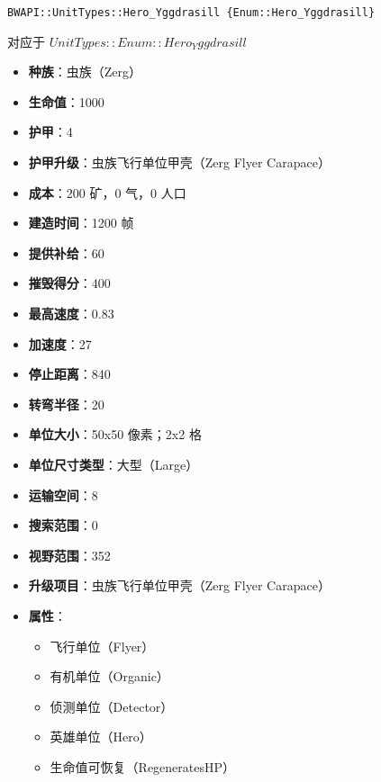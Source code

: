 \begin{tcolorbox}[colback=white, colframe=black!60!white, title=Hero\_Yggdrasill(), arc=0mm]
    \begin{verbatim}
BWAPI::UnitTypes::Hero_Yggdrasill {Enum::Hero_Yggdrasill}
    \end{verbatim}
    对应于  $ UnitTypes::Enum::Hero_Yggdrasill $ 
    \begin{itemize}
        \item \textbf{种族}：虫族（Zerg）
        \item \textbf{生命值}：1000
        \item \textbf{护甲}：4
        \item \textbf{护甲升级}：虫族飞行单位甲壳（Zerg Flyer Carapace）
        \item \textbf{成本}：200 矿，0 气，0 人口
        \item \textbf{建造时间}：1200 帧
        \item \textbf{提供补给}：60
        \item \textbf{摧毁得分}：400
        \item \textbf{最高速度}：0.83
        \item \textbf{加速度}：27
        \item \textbf{停止距离}：840
        \item \textbf{转弯半径}：20
        \item \textbf{单位大小}：50x50 像素；2x2 格
        \item \textbf{单位尺寸类型}：大型（Large）
        \item \textbf{运输空间}：8
        \item \textbf{搜索范围}：0
        \item \textbf{视野范围}：352
        \item \textbf{升级项目}：虫族飞行单位甲壳（Zerg Flyer Carapace）
        \item \textbf{属性}：
            \begin{itemize}
                \item 飞行单位（Flyer）
                \item 有机单位（Organic）
                \item 侦测单位（Detector）
                \item 英雄单位（Hero）
                \item 生命值可恢复（RegeneratesHP）
            \end{itemize}
    \end{itemize}
\end{tcolorbox}

